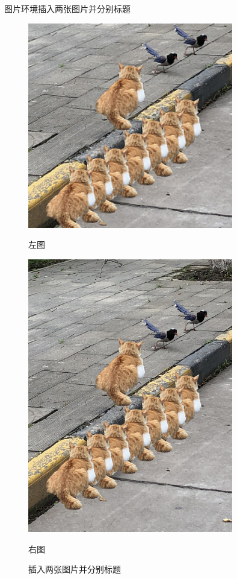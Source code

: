\documentclass[no-math, compress]{beamer}
\begin{document}
\begin{frame}{图片环境}{插入两张图片并分别标题}
    \begin{figure}
        \centering
        \begin{minipage}[t]{0.4\textwidth}
            \centering
            \includegraphics[width=0.8\textwidth]{thumbnail-image01}
            \caption{左图}
        \end{minipage}
        \qquad
        \begin{minipage}[t]{0.4\textwidth}
            \centering
            \includegraphics[width=0.8\textwidth]{image01}
            \caption{右图}
        \end{minipage}
        \caption{插入两张图片并分别标题}
    \end{figure}
\end{frame}
\end{document}
